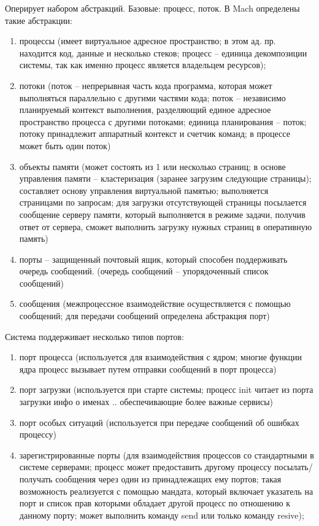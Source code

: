Оперирует набором абстракций. Базовые: процесс, поток. 
В Mach определены такие абстракции:
\begin{enumerate}
    \item процессы (имеет виртуальное адресное пространство; в этом ад. пр. находится код, данные и несколько стеков; процесс – единица декомпозиции системы, так как именно процесс является владельцем ресурсов);
    \item потоки (поток – непрерывная часть кода программа, которая может выполняться параллельно с другими частями кода; поток – независимо планируемый контекст выполнения, разделяющий единое адресное пространство процесса с другими потоками; единица планирования – поток; потоку принадлежит аппаратный контекст и счетчик команд; в процессе может быть один поток)
    \item объекты памяти (может состоять из 1 или несколько страниц; в основе управления памяти – кластеризация (заранее загрузим следующие страницы); составляет основу управления виртуальной памятью; выполняется страницами по запросам; для загрузки отсутствующей страницы посылается сообщение серверу памяти, который выполняется в режиме задачи, получив ответ от сервера, сможет выполнить загрузку нужных страниц в оперативную память) 
    \item порты – защищенный почтовый ящик, который способен поддерживать очередь сообщений. (очередь сообщений – упорядоченный список сообщений)
    \item сообщения (межпроцессное взаимодействие осуществляется с помощью сообщений; для передачи сообщений определена абстракция порт)
\end{enumerate} 


Система поддерживает несколько типов портов:
\begin{enumerate}
    \item порт процесса (используется для взаимодействия с ядром; многие функции ядра процесс вызывает путем отправки сообщений в порт процесса)
    \item порт загрузки (используется при старте системы; процесс init читает из порта загрузки инфо о именах .. обеспечивающие более важные сервисы) 
    \item порт особых ситуаций (используется при передаче сообщений об ошибках процессу)
    \item зарегистрированные порты (для взаимодействия процессов со стандартными в системе серверами; процесс может предоставить другому процессу посылать/получать сообщения через один из принадлежащих ему портов; такая возможность реализуется с помощью мандата, который включает указатель на порт и список прав которыми обладает другой процесс по отношению к данному порту; может выполнить команду send или только команду resive);
\end{enumerate} 

